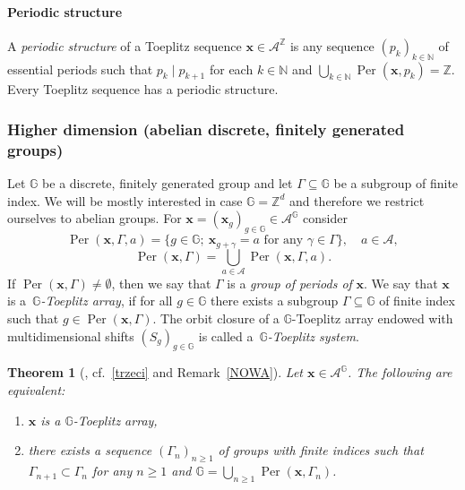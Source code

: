 \documentclass[leqno,a4paper,12pt]{article}
\newtheorem{Th}{Theorem}[section]
\theoremstyle{definition}
\newcommand{\divides}{\mid}
\newcommand{\Per}{\operatorname{Per}\nolimits}
\newcommand{\Z}{{\mathbb{Z}}}
\newcommand{\N}{{\mathbb{N}}}
\newcommand{\G}{\mathbb{G}}
\begin{document}
\paragraph{Periodic structure}
A \emph{periodic structure} \cite{MR756807} of a Toeplitz sequence $\bm{x}\in\mathcal{A}^\Z$ is any sequence $(p_k)_{k\in \N}$ of essential periods such that $p_k\divides p_{k+1}$ for each $k\in\N$ and
$\bigcup_{k\in\N} \operatorname{Per}(\bm{x},p_k) = \Z$. Every Toeplitz sequence has a periodic structure.



\subsubsection{Higher dimension (abelian discrete, finitely generated groups)}
Let $\mathbb{G}$ be a discrete, finitely generated group and let $\Gamma\subseteq \G$ be a subgroup of finite index. We will be mostly interested in case $\G=\Z^d$ and therefore we restrict ourselves to abelian groups. For $\bm{x}=(\bm{x}_g)_{g\in\G}\in\mathcal{A}^\G$ consider
\[\Per(\bm{x},\Gamma,a)=\{g\in\G; \ \bm{x}_{g+\gamma}=a \text{ for any } \gamma\in\Gamma\}, \quad a\in\mathcal{A},\]
\[\Per(\bm{x},\Gamma)=\bigcup_{a\in\mathcal{A}}\Per(\bm{x},\Gamma,a).\]
If $\Per(\bm{x},\Gamma)\neq\emptyset$, then we say that $\Gamma$ is a \emph{group of periods of }$\bm{x}$.
We say that $\bm{x}$ is a~\emph{$\G$-Toeplitz array}, if for all $g\in\G$ there exists a subgroup $\Gamma\subseteq\G$ of finite index such that $g\in\Per(\bm{x},\Gamma)$. The orbit closure of a $\G$-Toeplitz array endowed with multidimensional shifts $(S_g)_{g\in \G}$ is called a~\emph{$\G$-Toeplitz system}.
\begin{Th}[{\cite[Proposition 5]{MR2427048}},  cf.~\eqref{trzeci} and Remark~\ref{NOWA}]
\label{Cor-Pet}
Let $\bm{x}\in\mathcal{A}^{\G}$. The following are equivalent:
\begin{enumerate}[(1)]
\item $\bm{x}$ is a $\G$-Toeplitz array,
\item there exists a sequence $(\Gamma_n)_{n\geq1}$ of groups with finite indices such that $\Gamma_{n+1}\subset\Gamma_n$ for any $n\geq1$ and $\G=\bigcup_{n\geq1}\Per(\bm{x},\Gamma_n)$.
\end{enumerate}
\end{Th}
\end{document}
